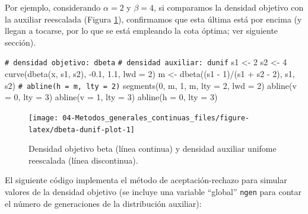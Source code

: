 \documentclass[
  10pt,
]{book}
\newenvironment{Shaded}{\begin{snugshade}}{\end{snugshade}}
\newcommand{\AttributeTok}[1]{\textcolor[rgb]{0.77,0.63,0.00}{#1}}
\newcommand{\CommentTok}[1]{\textcolor[rgb]{0.56,0.35,0.01}{\textit{#1}}}
\newcommand{\DecValTok}[1]{\textcolor[rgb]{0.00,0.00,0.81}{#1}}
\newcommand{\FloatTok}[1]{\textcolor[rgb]{0.00,0.00,0.81}{#1}}
\newcommand{\FunctionTok}[1]{\textcolor[rgb]{0.00,0.00,0.00}{#1}}
\newcommand{\NormalTok}[1]{#1}
\newcommand{\OtherTok}[1]{\textcolor[rgb]{0.56,0.35,0.01}{#1}}
\newcommand{\SpecialCharTok}[1]{\textcolor[rgb]{0.00,0.00,0.00}{#1}}
\theoremstyle{break}
\theoremstyle{nonumberplain}
\renewcommand{\CommentTok}[1]{\textcolor[rgb]{0.41,0.41,0.41}{\texttt{#1}}}
\begin{document}
Por ejemplo, considerando \(\alpha = 2\) y \(\beta = 4\), si comparamos la densidad objetivo con la auxiliar reescalada (Figura \ref{fig:dbeta-dunif-plot}), confirmamos que esta última está por encima (y llegan a tocarse, por lo que se está empleando la cota óptima; ver siguiente sección).

\begin{Shaded}
\begin{Highlighting}[]
\CommentTok{\# densidad objetivo: dbeta}
\CommentTok{\# densidad auxiliar: dunif}
\NormalTok{s1 }\OtherTok{\textless{}{-}} \DecValTok{2}
\NormalTok{s2 }\OtherTok{\textless{}{-}} \DecValTok{4}
\FunctionTok{curve}\NormalTok{(}\FunctionTok{dbeta}\NormalTok{(x, s1, s2), }\SpecialCharTok{{-}}\FloatTok{0.1}\NormalTok{, }\FloatTok{1.1}\NormalTok{, }\AttributeTok{lwd =} \DecValTok{2}\NormalTok{)}
\NormalTok{m }\OtherTok{\textless{}{-}} \FunctionTok{dbeta}\NormalTok{((s1 }\SpecialCharTok{{-}} \DecValTok{1}\NormalTok{)}\SpecialCharTok{/}\NormalTok{(s1 }\SpecialCharTok{+}\NormalTok{ s2 }\SpecialCharTok{{-}} \DecValTok{2}\NormalTok{), s1, s2)}
\CommentTok{\# abline(h = m, lty = 2)}
\FunctionTok{segments}\NormalTok{(}\DecValTok{0}\NormalTok{, m, }\DecValTok{1}\NormalTok{, m, }\AttributeTok{lty =} \DecValTok{2}\NormalTok{, }\AttributeTok{lwd =} \DecValTok{2}\NormalTok{)}
\FunctionTok{abline}\NormalTok{(}\AttributeTok{v =} \DecValTok{0}\NormalTok{, }\AttributeTok{lty =} \DecValTok{3}\NormalTok{)}
\FunctionTok{abline}\NormalTok{(}\AttributeTok{v =} \DecValTok{1}\NormalTok{, }\AttributeTok{lty =} \DecValTok{3}\NormalTok{)}
\FunctionTok{abline}\NormalTok{(}\AttributeTok{h =} \DecValTok{0}\NormalTok{, }\AttributeTok{lty =} \DecValTok{3}\NormalTok{)}
\end{Highlighting}
\end{Shaded}

\begin{figure}[!htbp]

{\centering \texttt{[image: 04-Metodos\_generales\_continuas\_files/figure-latex/dbeta-dunif-plot-1]} 

}

\caption{Densidad objetivo beta (línea continua) y densidad auxiliar unifome reescalada (línea discontinua).}\label{fig:dbeta-dunif-plot}
\end{figure}

El siguiente código implementa el método de aceptación-rechazo para simular valores de la densidad objetivo (se incluye una variable ``global'' \texttt{ngen} para contar el número de generaciones de la distribución auxiliar):
\end{document}
